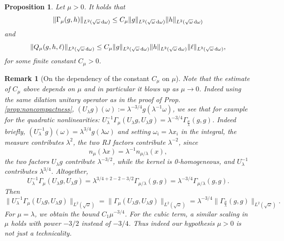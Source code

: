 \documentclass[reqno,11pt,letterpaper]{amsart}
\numberwithin{equation}{section}
\newcommand{\dd}{\, {\rm d}}
\newtheorem{proposition}{Proposition}[section]
\newtheorem{remark}{Remark}
\begin{document}
\begin{proposition}\label{prop: control NL} Let $\mu>0$.
    It holds that 
    $$\|\Gamma_\mu (g,h)\|_{L^2(\sqrt{\omega}\dd\omega)} \leq C_\mu \|g\|_{L^2(\sqrt{\omega}\dd\omega)}\|h\|_{L^2(\sqrt{\omega}\dd\omega)}$$
    and 
    $$\|Q_\mu (g,h, \ell)\|_{L^2(\sqrt{\omega}\dd\omega)} \leq C_\mu \|g\|_{L^2(\sqrt{\omega}\dd\omega)} \|h\|_{L^2(\sqrt{\omega}\dd\omega)} \|\ell\|_{L^2(\sqrt{\omega}\dd\omega)},  
    $$
    for some finite constant $C_\mu>0$. 
    \end{proposition}

\begin{remark}[On the dependency of the constant $C_\mu$ on $\mu$]
Note that the estimate of $C_\mu $ above depends on $\mu$ and in particular it blows up as $\mu \to 0$. Indeed using the same dilation unitary operator as in the proof of Prop. \ref{prop:noncompactness}, $(U_\lambda g)(\omega) := \lambda^{-3/4} g(\lambda^{-1}\omega)$, we see that for example for the quadratic nonlinearities: $U_\lambda^{-1} \Gamma_{\mu} (U_\lambda g,U_\lambda g) = \lambda^{-3/4}\Gamma_{\tfrac{\mu}{\lambda}} (g,g) $. Indeed briefly, $(U_\lambda^{-1}g)(\omega)=\lambda^{3/4}g(\lambda\omega)$ and setting $ \omega_i=\lambda x_i$ in the integral, the measure contributes $\lambda^2$, the two RJ  factors contribute $\lambda^{-2}$, since $$ n_\mu(\lambda x)=\lambda^{-1}n_{\mu/\lambda}(x),  $$ the two factors $U_\lambda g$ contribute $\lambda^{-3/2}$, while the kernel is 0-homogeneous, and $U_\lambda^{-1}$ contributes $\lambda^{3/4}$. Altogether, $$ U_\lambda^{-1}\Gamma_\mu(U_\lambda g,U_\lambda g) = \lambda^{3/4+2-2-3/2} \Gamma_{\mu/\lambda}(g,g) = \lambda^{-3/4}\Gamma_{\mu/\lambda}(g,g). $$
Then $$\| U_\lambda^{-1} \Gamma_{\mu} (U_\lambda g,U_\lambda g)\|_{L^2(\sqrt{\omega})} = \| \Gamma_{\mu} (U_\lambda g,U_\lambda g) \|_{L^2(\sqrt{\omega})}  = \lambda^{-3/4} \|\Gamma_{\tfrac{\mu}{\lambda}} ( g,g) \|_{L^2(\sqrt{\omega})}. $$
For $\mu=\lambda$, we obtain the bound $C_1\mu^{-3/4}$. For the cubic term, a similar scaling in $\mu$ holds with power $-3/2$ instead of $-3/4$. Thus indeed our hypothesis $\mu>0$ is not just a technicality. 
\end{remark}
\end{document}
